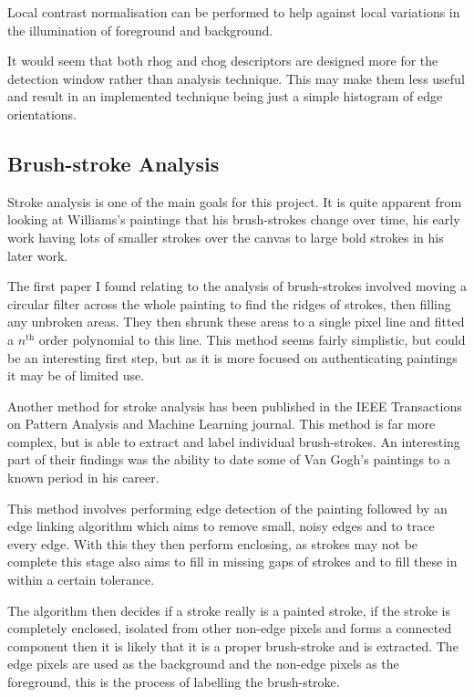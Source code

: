 Local contrast normalisation can be performed to help against local variations in the illumination
of foreground and background.

It would seem that both \gls{rhog} and \gls{chog} descriptors are designed more for the detection
window rather than analysis technique. This may make them less useful and result in an implemented
technique being just a simple histogram of edge orientations.

\subsection{Brush-stroke Analysis}\label{sec:existing-brush-stroke}
Stroke analysis is one of the main goals for this project. It is quite apparent from looking at 
Williams's paintings that his brush-strokes change over time, his early work having lots of
smaller strokes over the canvas to large bold strokes in his later work.

The first paper I found relating to the analysis of brush-strokes involved moving a circular filter
across the whole painting to find the ridges of strokes, then filling any unbroken areas. They then
shrunk these areas to a single pixel line and fitted a $n^{\text{th}}$ order polynomial to this
line\cite{Berezhnoy2005Authentic}. This method seems fairly simplistic, but could be an interesting
first step, but as it is more focused on authenticating paintings it may be of limited use.

Another method for stroke analysis has been published in the IEEE Transactions on Pattern Analysis
and Machine Learning journal. This method is far more complex, but is able to extract and label
individual brush-strokes. An interesting part of their findings was the ability to date some of Van
Gogh's paintings to a known period in his career\cite{Li2012Rhythmic}.

This method involves performing edge detection of the painting followed by an edge linking 
algorithm which aims to remove small, noisy edges and to trace every edge. With this they then
perform enclosing, as strokes may not be complete this stage also aims to fill in missing gaps of
strokes and to fill these in within a certain tolerance.

The algorithm then decides if a stroke really is a painted stroke, if the stroke is completely 
enclosed, isolated from other non-edge pixels and forms a connected component then it is likely 
that it is a proper brush-stroke and is extracted. The edge pixels are used as the background and
the non-edge pixels as the foreground, this is the process of labelling the brush-stroke.

